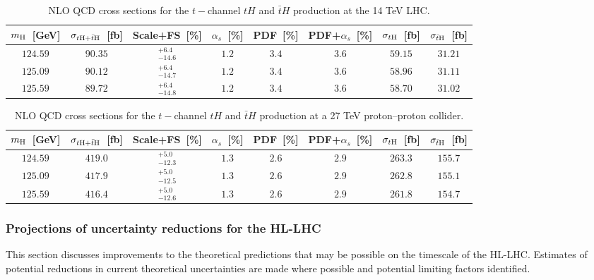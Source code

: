 \begin{table}
\centering
\begin{tabular}{cccccccc}
\toprule
$m_{\rm H}$~[GeV] & $\sigma_{t{\rm H}+\bar t{\rm H}}$~[fb] & Scale+FS~[\%] &
$\alpha_s$~[\%] & PDF~[\%] & PDF+${\alpha_s}$~[\%] & $\sigma_{t{\rm H}}$~[fb] & 
$\sigma_{\bar t{\rm H}}$~[fb]\\
\midrule
$124.59$ & $90.35$ & $^{+6.4}_{-14.6}$ & $1.2$ & $3.4$ & $3.6$ & $59.15$ & $31.21$\\
$125.09$ & $90.12$ & $^{+6.4}_{-14.7}$ & $1.2$ & $3.4$ & $3.6$ & $58.96$ & $31.11$\\
$125.59$ & $89.72$ & $^{+6.4}_{-14.8}$ & $1.2$ & $3.4$ & $3.6$ & $58.70$ & $31.02$\\
\bottomrule
\end{tabular}
\caption{NLO QCD cross sections for the $t-$channel $tH$ and $\bar t H$
production at the 14 TeV LHC.}
\label{tab:tH14_xsec}
\end{table}

\begin{table}
\centering
\begin{tabular}{cccccccc}
\toprule
$m_{\rm H}$~[GeV] & $\sigma_{t{\rm H}+\bar t{\rm H}}$~[fb] & Scale+FS~[\%] &
$\alpha_s$~[\%] & PDF~[\%] & PDF+${\alpha_s}$~[\%] & $\sigma_{t{\rm H}}$~[fb] & 
$\sigma_{\bar t{\rm H}}$~[fb]\\
\midrule
$124.59$ & $419.0$ & $^{+5.0}_{-12.3}$ & $1.3$ & $2.6$ & $2.9$ & $263.3$ & $155.7$\\
$125.09$ & $417.9$ & $^{+5.0}_{-12.5}$ & $1.3$ & $2.6$ & $2.9$ & $262.8$ & $155.1$\\
$125.59$ & $416.4$ & $^{+5.0}_{-12.6}$ & $1.3$ & $2.6$ & $2.9$ & $261.8$ & $154.7$\\
\bottomrule
\end{tabular}
\caption{NLO QCD cross sections for the $t-$channel $tH$ and $\bar t H$
production at a 27 TeV proton--proton collider.}
\label{tab:tH27_xsec}
\end{table}
 

\subsubsection{Projections of uncertainty reductions for the HL-LHC}
\label{sec:hl-lhc}

This section discusses improvements to the theoretical predictions that may be
possible on the timescale of the HL-LHC.  Estimates of potential reductions in
current theoretical uncertainties are made where possible and potential limiting
factors identified.

